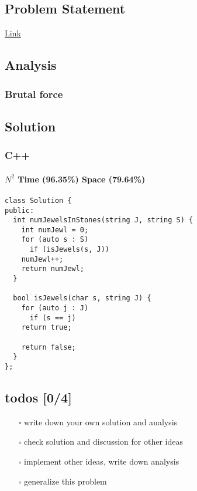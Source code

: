 \documentclass[11pt]{article}
\begin{document}
\subsection{Problem Statement}
\label{sec:org047feed}
\href{https://leetcode.com/problems/jewels-and-stones/}{Link}
\subsection{Analysis}
\label{sec:org82b6be6}
\subsubsection{Brutal force}
\label{sec:org686ba53}
\subsection{Solution}
\label{sec:org9c0d121}
\subsubsection{C++}
\label{sec:orgd540116}
\paragraph{\(N^2\) Time (96.35\%) Space (79.64\%)}
\label{sec:org27c9fa2}
\begin{verbatim}
class Solution {
public:
  int numJewelsInStones(string J, string S) {
    int numJewl = 0;
    for (auto s : S)
      if (isJewels(s, J))
	numJewl++;
    return numJewl;
  }

  bool isJewels(char s, string J) {
    for (auto j : J)
      if (s == j)
	return true;

    return false;
  }
};
\end{verbatim}
\subsection{todos [0/4]}
\label{sec:org2d39ebc}
\begin{itemize}
\item[{$\square$}] write down your own solution and analysis
\item[{$\square$}] check solution and discussion for other ideas
\item[{$\square$}] implement other ideas, write down analysis
\item[{$\square$}] generalize this problem
\end{itemize}
\end{document}
